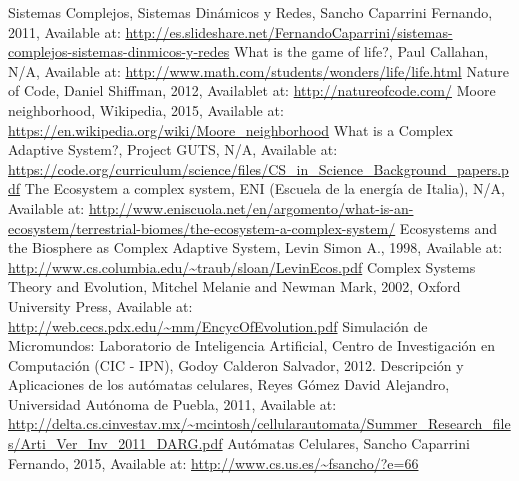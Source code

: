 \begin{thebibliography}{1}
    Sistemas Complejos, Sistemas Dinámicos y Redes, Sancho Caparrini Fernando, 2011, Available at: \url{http://es.slideshare.net/FernandoCaparrini/sistemas-complejos-sistemas-dinmicos-y-redes}
    What is the game of life?, Paul Callahan, N/A, Available at: \url{http://www.math.com/students/wonders/life/life.html}
    Nature of Code, Daniel Shiffman, 2012, Availablet at: \url{http://natureofcode.com/}
    Moore neighborhood, Wikipedia, 2015, Available at: \url{https://en.wikipedia.org/wiki/Moore_neighborhood}
    What is a Complex Adaptive System?, Project GUTS, N/A, Available at: \url{https://code.org/curriculum/science/files/CS_in_Science_Background_papers.pdf}
    The Ecosystem\: a complex system, ENI (Escuela de la energía de Italia), N/A, Available at: \url{http://www.eniscuola.net/en/argomento/what-is-an-ecosystem/terrestrial-biomes/the-ecosystem-a-complex-system/}
    Ecosystems and the Biosphere as Complex Adaptive System, Levin Simon A., 1998, Available at: \url{http://www.cs.columbia.edu/~traub/sloan/LevinEcos.pdf}
    Complex Systems Theory and Evolution, Mitchel Melanie and Newman Mark, 2002, Oxford University Press, Available at: \url{http://web.cecs.pdx.edu/~mm/EncycOfEvolution.pdf}
    Simulación de Micromundos: Laboratorio de Inteligencia Artificial, Centro de Investigación en Computación (CIC - IPN), Godoy Calderon Salvador, 2012.
    Descripción y Aplicaciones de los autómatas celulares, Reyes Gómez David Alejandro, Universidad Autónoma de Puebla, 2011, Available at: \url{http://delta.cs.cinvestav.mx/~mcintosh/cellularautomata/Summer_Research_files/Arti_Ver_Inv_2011_DARG.pdf}
    Autómatas Celulares, Sancho Caparrini Fernando, 2015, Available at: \url{http://www.cs.us.es/~fsancho/?e=66}

\end{thebibliography}

